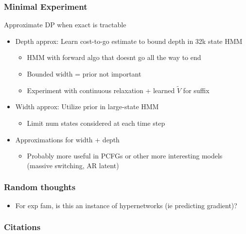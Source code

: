\documentclass{beamer}
\begin{document}
\begin{frame}
\frametitle{Minimal Experiment}
Approximate DP when exact is tractable
\begin{itemize}
\item Depth approx: Learn cost-to-go estimate to bound depth in 32k state HMM
    \begin{itemize}
    \item HMM with forward algo that doesnt go all the way to end
    \item Bounded width = prior not important
    \item Experiment with continuous relaxation + learned $\tilde{V}$
        for suffix
    \end{itemize}
\item Width approx: Utilize prior in large-state HMM
    \begin{itemize}
    \item Limit num states considered at each time step
    \end{itemize}
\item Approximations for width + depth
    \begin{itemize}
    \item Probably more useful in PCFGs or other more interesting models
        (massive switching, AR latent)
    \end{itemize}
\end{itemize}
\end{frame}

\begin{frame}
\frametitle{Random thoughts}
\begin{itemize}
\item For exp fam, is this an instance of hypernetworks (ie predicting gradient)?
\end{itemize}
\end{frame}

\begin{frame}[allowframebreaks]
\frametitle{Citations}

\end{frame}
\end{document}
